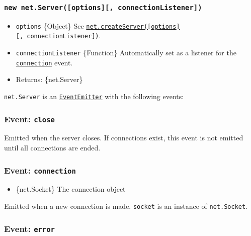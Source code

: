 \subsubsection{\texorpdfstring{\texttt{new\ net.Server({[}options{]}{[},\ connectionListener{]})}}{new net.Server({[}options{]}{[}, connectionListener{]})}}\label{new-net.serveroptions-connectionlistener}

\begin{itemize}
\tightlist
\item
  \texttt{options} \{Object\} See
  \hyperref[netcreateserveroptions-connectionlistener]{\texttt{net.createServer({[}options{]}{[},\ connectionListener{]})}}.
\item
  \texttt{connectionListener} \{Function\} Automatically set as a
  listener for the
  \hyperref[event-connection]{\texttt{\textquotesingle{}connection\textquotesingle{}}}
  event.
\item
  Returns: \{net.Server\}
\end{itemize}

\texttt{net.Server} is an
\href{events.md\#class-eventemitter}{\texttt{EventEmitter}} with the
following events:

\subsubsection{\texorpdfstring{Event:
\texttt{\textquotesingle{}close\textquotesingle{}}}{Event: \textquotesingle close\textquotesingle{}}}\label{event-close}

Emitted when the server closes. If connections exist, this event is not
emitted until all connections are ended.

\subsubsection{\texorpdfstring{Event:
\texttt{\textquotesingle{}connection\textquotesingle{}}}{Event: \textquotesingle connection\textquotesingle{}}}\label{event-connection}

\begin{itemize}
\tightlist
\item
  \{net.Socket\} The connection object
\end{itemize}

Emitted when a new connection is made. \texttt{socket} is an instance of
\texttt{net.Socket}.

\subsubsection{\texorpdfstring{Event:
\texttt{\textquotesingle{}error\textquotesingle{}}}{Event: \textquotesingle error\textquotesingle{}}}\label{event-error}

